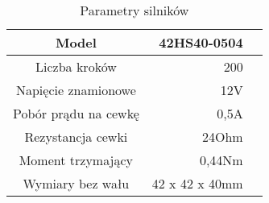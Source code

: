 \begin{table}
	\centering
	
	\begin{tabular}{|c|r|r|}
	
		\hline
		Model& 42HS40-0504 \\		
		\hline
		Liczba kroków&  200\\      
		\hline                                      
		Napięcie znamionowe &12V   \\       
		\hline                                      
		Pobór prądu na cewkę &  0,5A\\ 
		\hline                                                                         
		Rezystancja cewki & 24Ohm\\
		\hline      
		Moment trzymający& 0,44Nm\\
		\hline      
		Wymiary bez wału& 42 x 42 x 40mm\\
		\hline      
		
		\hline        
	\end{tabular}
	\caption{Parametry silników}
	\label{tab:skutecznosc}	
\end{table}


